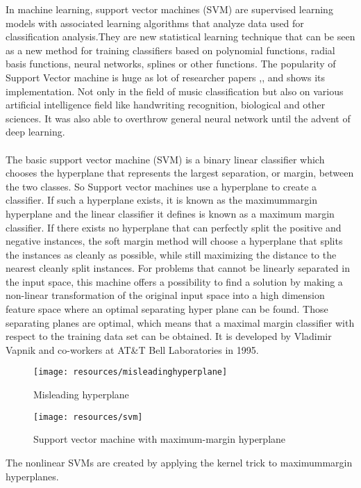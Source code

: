 In machine learning, support vector machines (SVM) are supervised learning models with 
associated learning algorithms that analyze data used for classification analysis.They are new statistical learning technique that can be seen as a new method for training
classifiers based on polynomial functions, radial basis functions, neural networks, splines or other functions. The popularity of Support Vector machine is huge as lot of researcher papers
  \cite{Kour2015},\cite{Anglade2010}, \cite{Koerich2013} and \cite{Haggblade2011} shows its implementation. Not only in the field of music classification but also on various artificial intelligence field like handwriting
recognition, biological and other sciences. It was also able to overthrow general neural network until the advent of deep learning.\\
\\
The basic support vector machine (SVM) is a binary linear classifier which chooses the hyperplane that represents the largest separation, or margin, between the two classes. So  Support vector machines use
a hyperplane to create a classifier. If such a hyperplane exists, it is known as the maximum­margin hyperplane and the linear classifier it defines is known as a maximum margin classifier. 
If there exists no hyperplane that can perfectly split the positive and negative instances, the soft 
margin method will choose a hyperplane that splits the instances as cleanly as possible, while still 
maximizing the distance to the nearest cleanly split instances. For problems that cannot be linearly separated in the input space, this machine offers a possibility to find a solution by making 
a non-linear transformation of the original input space into a high dimension feature space where an optimal separating hyper plane can be found. Those separating planes are optimal, which means
that a maximal margin classifier with respect to the training data set can be obtained. It is developed by Vladimir Vapnik and co-workers at AT\&T Bell Laboratories in 1995.\\
\begin{figure}[h!]
        \texttt{[image: resources/misleadinghyperplane]}
        \caption{Misleading hyperplane}
\end{figure}
\begin{figure}[h!]
        \texttt{[image: resources/svm]}
        \caption{Support vector machine with maximum-margin hyperplane}
\end{figure}
The nonlinear SVMs are created by applying the kernel trick to maximum­margin hyperplanes. 
